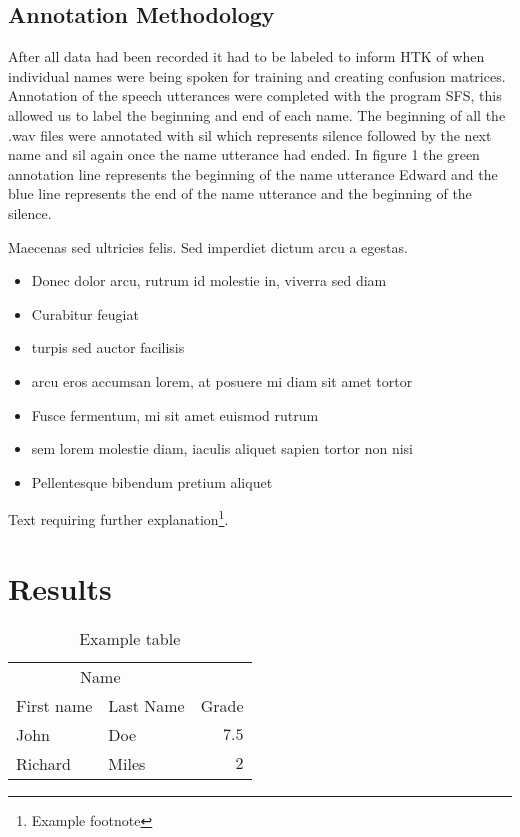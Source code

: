 \documentclass[twoside,twocolumn]{article}
\begin{document}
\subsection{Annotation Methodology}
After all data had been recorded it had to be labeled to inform HTK of when individual names were being spoken for training and creating confusion matrices. Annotation of the speech utterances were completed with the program SFS, this allowed us to label the beginning and end of each name. The beginning of all the .wav files were annotated with sil which represents silence followed by the next name and sil again once the name utterance had ended.
In figure 1 the green annotation line represents the beginning of the name utterance Edward and the blue line represents the end of the name utterance and the beginning of the silence.


Maecenas sed ultricies felis. Sed imperdiet dictum arcu a egestas. 
\begin{itemize}
\item Donec dolor arcu, rutrum id molestie in, viverra sed diam
\item Curabitur feugiat
\item turpis sed auctor facilisis
\item arcu eros accumsan lorem, at posuere mi diam sit amet tortor
\item Fusce fermentum, mi sit amet euismod rutrum
\item sem lorem molestie diam, iaculis aliquet sapien tortor non nisi
\item Pellentesque bibendum pretium aliquet
\end{itemize}
\blindtext %

Text requiring further explanation\footnote{Example footnote}.


\section{Results}

\begin{table}
\caption{Example table}
\centering
\begin{tabular}{llr}
\toprule
\multicolumn{2}{c}{Name} \\
\cmidrule(r){1-2}
First name & Last Name & Grade \\
\midrule
John & Doe & $7.5$ \\
Richard & Miles & $2$ \\
\bottomrule
\end{tabular}
\end{table}
\end{document}
